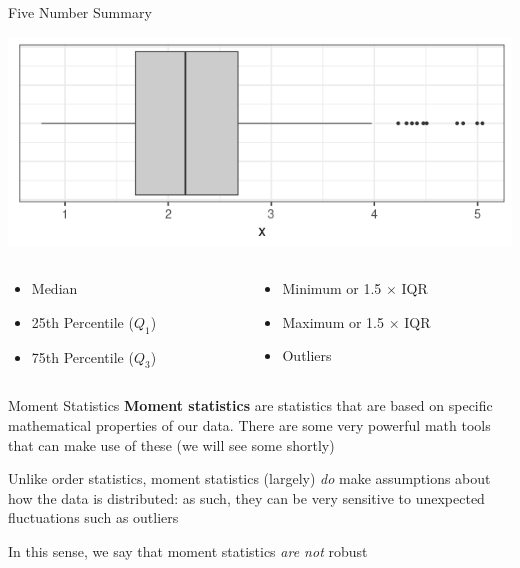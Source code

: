 \documentclass{beamer}
\begin{document}
\begin{frame}{Five Number Summary}
\begin{center}
\includegraphics[scale=0.5]{box.png}
\end{center}
\begin{columns}

  \begin{column}{0.45\textwidth}
\begin{itemize}
\item Median
\item 25th Percentile ($Q_1$)
\item 75th Percentile ($Q_3$)
\end{itemize}
  \end{column}
  \begin{column}{0.45\textwidth}
\begin{itemize}
\item Minimum or 1.5 $\times$ IQR
\item Maximum or 1.5 $\times$ IQR
\item Outliers
\end{itemize}
  \end{column}
\end{columns}
\end{frame}



\begin{frame}{Moment Statistics}
\textbf{Moment statistics} are statistics that are based on specific mathematical properties of our data. There are some very powerful math tools that can make use of these (we will see some shortly) \vspace{12mm}

Unlike order statistics, moment statistics (largely) \textit{do} make assumptions about how the data is distributed: as such, they can be very sensitive to unexpected fluctuations such as outliers \vspace{4mm}

In this sense, we say that moment statistics \textit{are not} robust
\end{frame}
\end{document}
